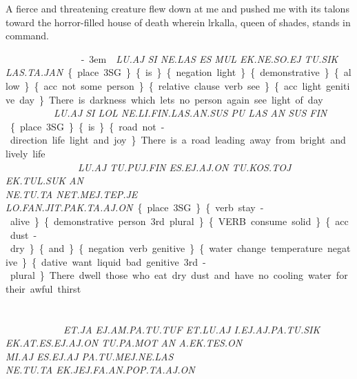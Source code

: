 {A fierce and threatening creature flew down at me and pushed me with its talons toward the horror-filled house of death wherein lrkalla, queen of shades, stands in command.  
 
 
\drie 

\es\aj ~ \si ~ \Atlanne\la ~ \es ~ \mul~\ek\Atlanne\so\ej~\tu\sik~\las\ta\jan\kern-3em\period

{\it LU.AJ SI NE.LAS ES MUL EK.NE.SO.EJ TU.SIK LAS.TA.JAN}

 \{place 3SG\} \{is\} \{negation light\} \{demonstrative\} \{allow\}\{acc. not some person\}\{relative clause verb see\}\{acc. light genitive day\} 

There is darkness which lets no person again see light of day.  

\drie 
 

\lu\aj ~ \si ~ \lol~ \Atlanne\li\fin\las\an\sus ~ \pu ~ \las ~ \an ~ \sus ~ \fin

{\it LU.AJ SI LOL NE.LI.FIN.LAS.AN.SUS PU LAS AN SUS FIN }

\{place 3SG\} \{is\}\{road not-direction life light and joy\} 

There is a road leading away from bright and lively life.  
 
\drie 

\lu\aj ~ \tu\puj\fin ~ \es\ej\aj\on ~  \tu\kos\toj ~ \ek\tul\suk ~ \an \\~ \Atlanne\tu\ta ~ \net\mep\tep\je ~ \lo\fan\jit\pak\ta\aj\on 

{\it LU.AJ TU.PUJ.FIN ES.EJ.AJ.ON  TU.KOS.TOJ EK.TUL.SUK AN \\NE.TU.TA NET.MEJ.TEP.JE LO.FAN.JIT.PAK.TA.AJ.ON}

\{place 3SG\} \{verb stay-alive\} \{demonstrative person 3rd plural\}\{VERB consume solid\}\{acc. dust-dry\} \{and\} \{negation verb genitive\} \{water change temperature negative\} \{dative want liquid bad genitive 3rd-plural\} 

There dwell those who eat dry dust and have no cooling water for their awful thirst.  
 
\drie

\et\ja ~ \ej\am\pa\tu\tuf ~ \et\lu\aj ~ \Atlani\ej\aj\pa\tu\sik \\~ \ek\at\es\ej\aj\on ~  \tu\pa\mot ~ \an ~ \Atlana\ek\tes\on ~ \\ ~  \mi\aj ~ \es\ej\aj ~ \pa\tu\mej\Atlanne\las ~  \\ \Atlanne\tu\ta \ek\jej\fa\an\pop\ta\aj\on 

{\it ET.JA EJ.AM.PA.TU.TUF ET.LU.AJ I.EJ.AJ.PA.TU.SIK \\EK.AT.ES.EJ.AJ.ON TU.PA.MOT AN A.EK.TES.ON \\ MI.AJ ES.EJ.AJ PA.TU.MEJ.NE.LAS \\NE.TU.TA EK.JEJ.FA.AN.POP.TA.AJ.ON }


}
